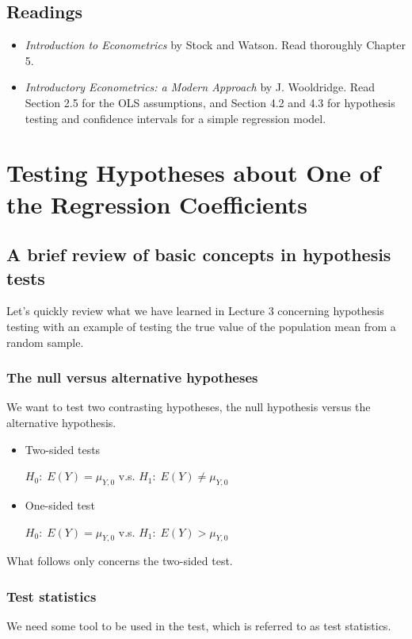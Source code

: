 \documentclass[a4paper,11pt]{article}
\begin{document}
\subsection{Readings}
\label{sec:orgb54f3c7}
\begin{itemize}
\item \emph{Introduction to Econometrics} by Stock and Watson. Read thoroughly
Chapter 5.
\item \emph{Introductory Econometrics: a Modern Approach} by
J. Wooldridge. Read Section 2.5 for the OLS assumptions, and Section
4.2 and 4.3 for hypothesis testing and confidence intervals for a
simple regression model.
\end{itemize}

\section{Testing Hypotheses about One of the Regression Coefficients}
\label{sec:orgffe4718}
\subsection{A brief review of basic concepts in hypothesis tests}
\label{sec:orgdc57329}
Let's quickly review what we have learned in Lecture 3 concerning
hypothesis testing with an example of testing the true value of the
population mean from a random sample. 
\subsubsection*{The null versus alternative hypotheses}
\label{sec:org2526068}
We want to test two contrasting hypotheses, the null hypothesis versus
the alternative hypothesis. 
\begin{itemize}
\item Two-sided tests

\(H_0:\; E(Y) = \mu_{Y,0}\) v.s. \(H_1:\; E(Y) \neq \mu_{Y,0}\)

\item One-sided test

\(H_0:\; E(Y) = \mu_{Y,0}\) v.s. \(H_1:\; E(Y) > \mu_{Y,0}\)
\end{itemize}

What follows only concerns the two-sided test. 

\subsubsection*{Test statistics}
\label{sec:orgbb33536}
We need some tool to be used in the test, which is referred to as test
statistics. 
\end{document}
